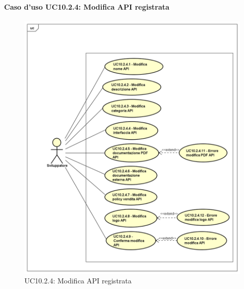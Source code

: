\paragraph{Caso d'uso UC10.2.4: Modifica API registrata}
\label{UC10_2_4}
\begin{figure}[ht]
	\centering
	\includegraphics[scale=0.45]{UML/UC10_2_4.png}
	\caption{UC10.2.4: Modifica API registrata}
\end{figure}

